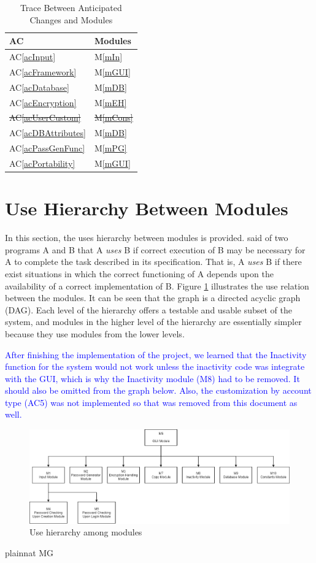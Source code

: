 \documentclass[12pt, titlepage]{article}
\newcommand{\acref}[1]{AC\ref{#1}}
\newcommand{\mref}[1]{M\ref{#1}}
\begin{document}
\begin{table}[H]
\centering
\begin{tabular}{p{} p{}}
\toprule
\textbf{AC} & \textbf{Modules}\\
\midrule
\acref{acInput} & \mref{mIn}\\
\acref{acFramework} & \mref{mGUI}\\
\acref{acDatabase} & \mref{mDB}\\
\acref{acEncryption} & \mref{mEH}\\
\sout{\acref{acUserCustom}} & \sout{\mref{mCons}}\\
\acref{acDBAttributes} & \mref{mDB}\\
\acref{acPassGenFunc} & \mref{mPG}\\
\acref{acPortability} & \mref{mGUI}\\
\bottomrule
\end{tabular}
\caption{Trace Between Anticipated Changes and Modules}
\label{TblACT}
\end{table}

\section{Use Hierarchy Between Modules} \label{SecUse}

In this section, the uses hierarchy between modules is
provided. \citet{Parnas1978} said of two programs A and B that A {\em uses} B if
correct execution of B may be necessary for A to complete the task described in
its specification. That is, A {\em uses} B if there exist situations in which
the correct functioning of A depends upon the availability of a correct
implementation of B.  Figure \ref{FigUH} illustrates the use relation between
the modules. It can be seen that the graph is a directed acyclic graph
(DAG). Each level of the hierarchy offers a testable and usable subset of the
system, and modules in the higher level of the hierarchy are essentially simpler
because they use modules from the lower levels. 

\textcolor{blue}{After finishing the implementation of the project, we learned that 
the Inactivity function for the system would not work unless the inactivity code was 
integrate with the GUI, which is why the Inactivity module (M8) had to be removed. It 
should also be omitted from the graph below. Also, the customization by account type (AC5) 
was not implemented so that was removed from this document as well.}

\begin{figure}[H]
\centering
\includegraphics[scale=0.5]{Images/DAG.png}
\caption{Use hierarchy among modules}
\label{FigUH}
\end{figure}


 {plainnat}
 {MG}
\end{document}
